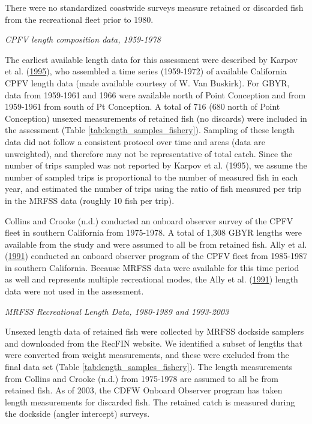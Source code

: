 \documentclass[12pt,]{article}
\begin{document}
There were no standardized coastwide surveys measure retained or
discarded fish from the recreational fleet prior to 1980.

\emph{CPFV length composition data, 1959-1978}

The earliest available length data for this assessment were described by
Karpov et al. (\protect\hyperlink{ref-Karpov1995}{1995}), who assembled
a time series (1959-1972) of available California CPFV length data (made
available courtesy of W. Van Buskirk). For GBYR, data from 1959-1961 and
1966 were available north of Point Conception and from 1959-1961 from
south of Pt Conception. A total of 716 (680 north of Point Conception)
unsexed measurements of retained fish (no discards) were included in the
assessment (Table \ref{tab:length_samples_fishery}). Sampling of these
length data did not follow a consistent protocol over time and areas
(data are unweighted), and therefore may not be representative of total
catch. Since the number of trips sampled was not reported by Karpov et
al. (1995), we assume the number of sampled trips is proportional to the
number of measured fish in each year, and estimated the number of trips
using the ratio of fish measured per trip in the MRFSS data (roughly 10
fish per trip).

Collins and Crooke (n.d.) conducted an onboard observer survey of the
CPFV fleet in southern California from 1975-1978. A total of 1,308 GBYR
lengths were available from the study and were assumed to all be from
retained fish. Ally et al. (\protect\hyperlink{ref-Ally1991}{1991})
conducted an onboard observer program of the CPFV fleet from 1985-1987
in southern California. Because MRFSS data were available for this time
period as well and represents multiple recreational modes, the Ally et
al. (\protect\hyperlink{ref-Ally1991}{1991}) length data were not used
in the assessment.

\emph{MRFSS Recreational Length Data, 1980-1989 and 1993-2003}

Unsexed length data of retained fish were collected by MRFSS dockside
samplers and downloaded from the RecFIN website. We identified a subset
of lengths that were converted from weight measurements, and these were
excluded from the final data set (Table
\ref{tab:length_samples_fishery}). The length measurements from Collins
and Crooke (n.d.) from 1975-1978 are assumed to all be from retained
fish. As of 2003, the CDFW Onboard Observer program has taken length
measurements for discarded fish. The retained catch is measured during
the dockside (angler intercept) surveys.
\end{document}
